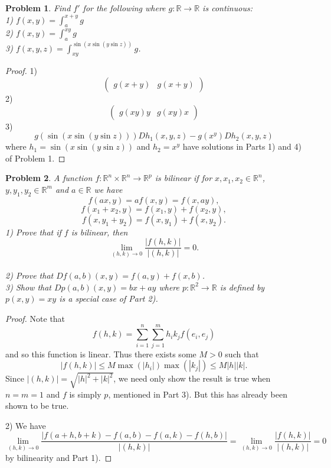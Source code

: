 \documentclass{article}
\newtheorem{problem}{Problem}
\begin{document}
\begin{flushleft}
\begin{problem}
Find $f'$ for the following where $g : \mathbb{R} \rightarrow \mathbb{R}$ is continuous:\\
1) $f(x,y) = \int_a^{x+y} g$\\
2) $f(x,y) = \int_a^{xy} g$\\
3) $f(x,y,z) = \int_{xy}^{\sin(x \sin (y \sin z))} g$.
\end{problem}
\begin{proof}
1)
\[
\left (
\begin{array}{cc}
g(x+y) & g(x+y)
\end{array}
\right )
\]
2)
\[
\left (
\begin{array}{cc}
g(xy) y & g(xy) x
\end{array}
\right )
\]
3)
\[
g(\sin (x \sin (y \sin z))) Dh_1 (x,y,z) - g(x^y) Dh_2 (x,y,z)
\]
where $h_1 = \sin (x \sin (y \sin z))$ and $h_2 = x^y$ have solutions in Parts 1) and 4) of Problem 1.
\end{proof}

\begin{problem}
A function $f : \mathbb{R}^n \times \mathbb{R}^n \rightarrow \mathbb{R}^p$ is bilinear if for $x, x_1, x_2 \in \mathbb{R}^n$, $y, y_1, y_2 \in \mathbb{R}^m$ and $a \in \mathbb{R}$ we have
\[
f(ax, y) = a f(x, y) = f(x, ay),
\]
\[
f(x_1 + x_2, y) = f(x_1, y) + f(x_2, y),
\]
\[
f(x, y_1 + y_2) = f(x, y_1) + f(x, y_2).
\]
1) Prove that if $f$ is bilinear, then
\[
\lim_{(h,k) \rightarrow 0} \frac{|f(h,k)|}{|(h,k)|} = 0.
\]\\
2) Prove that $Df(a,b)(x,y) = f(a,y) + f(x,b)$.\\
3) Show that $Dp(a,b)(x,y) = bx + ay$ where $p : \mathbb{R}^2 \rightarrow \mathbb{R}$ is defined by $p(x,y) = xy$ is a special case of Part 2).
\end{problem}
\begin{proof}
Note that
\[
f(h,k) = \sum_{i=1}^n \sum_{j=1}^m h_i k_j f (e_i, e_j)
\]
and so this function is linear. Thus there exists some $M > 0$ such that
\[
|f(h,k)| \leq M \max (|h_i|) \max (|k_j|) \leq M |h| |k|.
\]
Since $|(h,k)| = \sqrt{|h|^2 + |k|^2}$, we need only show the result is true when $n = m = 1$ and $f$ is simply $p$, mentioned in Part 3). But this has already been shown to be true.\newline

2) We have
\[
\lim_{(h,k) \rightarrow 0} \frac{|f(a+h, b+k) - f(a,b) - f(a,k) - f(h,b)|}{|(h,k)|} = \lim_{(h,k) \rightarrow 0} \frac{|f(h,k)|}{|(h,k)|} = 0
\]
by bilinearity and Part 1).\newline


\end{proof}
\end{flushleft}
\end{document}
